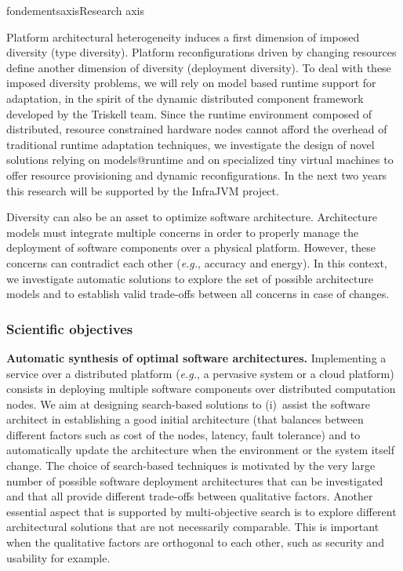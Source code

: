 \documentclass{ra2018}
\begin{document}
\begin{module}{fondements}{axis}{Research axis}

Platform architectural heterogeneity induces a first dimension of imposed diversity (type diversity). Platform reconfigurations driven by changing resources define another dimension of diversity (deployment diversity). To deal with these imposed diversity problems, we will  rely on  model based runtime support for adaptation, in the spirit of the dynamic distributed component framework developed by the Triskell team. Since the runtime environment composed of distributed, resource constrained hardware nodes cannot afford the overhead of traditional runtime adaptation techniques, we investigate the design of novel solutions relying on models@runtime and on specialized tiny virtual machines to offer resource provisioning and dynamic reconfigurations. In the next two years this research will be supported by the InfraJVM project.


Diversity can also be an asset to optimize software architecture. Architecture models must integrate multiple concerns in order to properly manage the deployment of software components over a physical platform. However, these concerns can contradict each other (\textit{e.g.}, accuracy and energy). In this context, we investigate automatic solutions to explore the set of possible architecture models and to establish valid trade-offs between all concerns in case of changes. 



\subsubsection*{Scientific objectives} 

 
\textbf{Automatic synthesis of optimal software architectures.} Implementing a service over a distributed platform (\textit{e.g.}, a pervasive system or a cloud platform) consists in deploying multiple software components over distributed computation nodes. We aim at designing search-based solutions to (i)~assist the software architect in establishing a good initial architecture (that balances between different factors such as cost of the nodes, latency, fault tolerance) and to automatically update the architecture when the environment or the system itself change. The choice of search-based techniques is motivated by the very large number of possible software deployment architectures that can be investigated and that all provide different trade-offs between qualitative factors. Another essential aspect that is supported by multi-objective search is to explore different architectural solutions that are not necessarily comparable. This is important when the qualitative factors are orthogonal to each other, such as security and usability for example.


\end{module}
\end{document}
